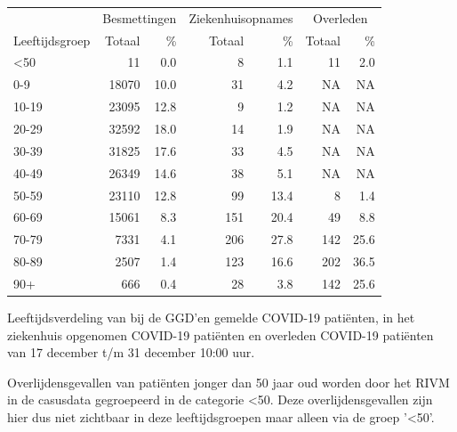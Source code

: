\documentclass[
  english,
  man,floatsintext]{apa6}
\begin{document}
\begin{table}
\centering\begingroup\fontsize{11}{13}\selectfont

\begin{threeparttable}
\begin{tabular}{lrrrrrr}
\toprule
\multicolumn{1}{c}{ } & \multicolumn{2}{c}{Besmettingen} & \multicolumn{2}{c}{Ziekenhuisopnames} & \multicolumn{2}{c}{Overleden} \\
\cmidrule(l{3pt}r{3pt}){2-3} \cmidrule(l{3pt}r{3pt}){4-5} \cmidrule(l{3pt}r{3pt}){6-7}
Leeftijdsgroep & Totaal & \% & Totaal & \% & Totaal & \%\\
\midrule
<50 & 11 & 0.0 & 8 & 1.1 & 11 & 2.0\\
0-9 & 18070 & 10.0 & 31 & 4.2 & NA & NA\\
10-19 & 23095 & 12.8 & 9 & 1.2 & NA & NA\\
20-29 & 32592 & 18.0 & 14 & 1.9 & NA & NA\\
30-39 & 31825 & 17.6 & 33 & 4.5 & NA & NA\\
40-49 & 26349 & 14.6 & 38 & 5.1 & NA & NA\\
50-59 & 23110 & 12.8 & 99 & 13.4 & 8 & 1.4\\
60-69 & 15061 & 8.3 & 151 & 20.4 & 49 & 8.8\\
70-79 & 7331 & 4.1 & 206 & 27.8 & 142 & 25.6\\
80-89 & 2507 & 1.4 & 123 & 16.6 & 202 & 36.5\\
90+ & 666 & 0.4 & 28 & 3.8 & 142 & 25.6\\
\bottomrule
\end{tabular}
\begin{tablenotes}
\item[1] Leeftijdsverdeling van bij de GGD’en gemelde COVID-19 patiënten, in het ziekenhuis opgenomen COVID-19 patiënten en overleden COVID-19 patiënten van 17 december t/m 31 december 10:00 uur.
\item[2] Overlijdensgevallen van patiënten jonger dan 50 jaar oud worden door het RIVM in de casusdata gegroepeerd in de categorie <50. Deze overlijdensgevallen zijn hier dus niet zichtbaar in deze leeftijdsgroepen maar alleen via de groep '<50'.
\end{tablenotes}
\end{threeparttable}
\endgroup{}
\end{table}

\newpage
\end{document}

